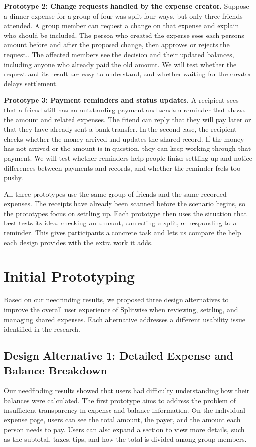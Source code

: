 \documentclass[letterpaper]{jdf}
\begin{document}
\textbf{Prototype 2: Change requests handled by the expense creator.} Suppose a dinner expense for a group of four was split four ways, but only three friends attended. A group member can request a change on that expense and explain who should be included. The person who created the expense sees each person\textquotesingle s amount before and after the proposed change, then approves or rejects the request.. The affected members see the decision and their updated balances, including anyone who already paid the old amount. We will test whether the request and its result are easy to understand, and whether waiting for the creator delays settlement.

\textbf{Prototype 3: Payment reminders and status updates.} A recipient sees that a friend still has an outstanding payment and sends a reminder that shows the amount and related expenses. The friend can reply that they will pay later or that they have already sent a bank transfer. In the second case, the recipient checks whether the money arrived and updates the shared record. If the money has not arrived or the amount is in question, they can keep working through that payment. We will test whether reminders help people finish settling up and notice differences between payments and records, and whether the reminder feels too pushy.

All three prototypes use the same group of friends and the same recorded expenses. The receipts have already been scanned before the scenario begins, so the prototypes focus on settling up. Each prototype then uses the situation that best tests its idea: checking an amount, correcting a split, or responding to a reminder. This gives participants a concrete task and lets us compare the help each design provides with the extra work it adds.


\section{Initial Prototyping}
Based on our needfinding results, we proposed three design alternatives to improve the overall user experience of Splitwise when reviewing, settling, and managing shared expenses. Each alternative addresses a different usability issue identified in the research.

\subsection{Design Alternative 1: Detailed Expense and Balance Breakdown}
Our needfinding results showed that users had difficulty understanding how their balances were calculated. The first prototype aims to address the problem of insufficient transparency in expense and balance information. On the individual expense page, users can see the total amount, the payer, and the amount each person needs to pay. Users can also expand a section to view more details, such as the subtotal, taxes, tips, and how the total is divided among group members.
\end{document}
